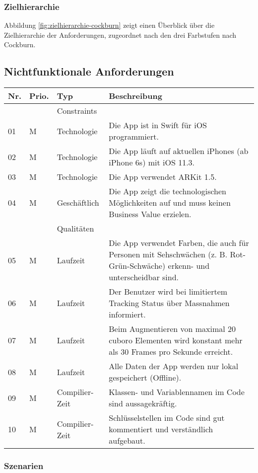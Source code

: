\subsubsection{Zielhierarchie}
Abbildung \ref{fig:zielhierarchie-cockburn} zeigt einen Überblick über die Zielhierarchie der Anforderungen, zugeordnet nach den drei Farbstufen nach Cockburn.

\subsection{Nichtfunktionale Anforderungen}

\begin{longtable}{l l l p{10cm}}
	\hline
	\textbf{Nr.} & \textbf{Prio.} & \textbf{Typ} & \textbf{Beschreibung} \\
	\hline
	 & & Constraints & \\
	\hline
	01 & M & Technologie & Die App ist in Swift für iOS programmiert. \\
	02 & M & Technologie & Die App läuft auf aktuellen iPhones (ab iPhone 6s) mit iOS 11.3. \\
	03 & M & Technologie & Die App verwendet ARKit 1.5. \\
	04 & M & Geschäftlich & Die App zeigt die technologischen Möglichkeiten auf und muss keinen Business Value erzielen. \\
	\hline
	 & & Qualitäten & \\
	\hline
	05 & M & Laufzeit & Die App verwendet Farben, die auch für Personen mit Sehschwächen (z. B. Rot-Grün-Schwäche) erkenn- und unterscheidbar sind. \\ 
	06 & M & Laufzeit & Der Benutzer wird bei limitiertem Tracking Status über Massnahmen informiert. \\
	07 & M & Laufzeit & Beim Augmentieren von maximal 20 cuboro Elementen wird konstant mehr als 30 Frames pro Sekunde erreicht. \\
	08 & M & Laufzeit & Alle Daten der App werden nur lokal gespeichert (Offline). \\
	09 & M & Compilier-Zeit & Klassen- und Variablennamen im Code sind aussagekräftig. \\
	10 & M & Compilier-Zeit & Schlüsselstellen im Code sind gut kommentiert und verständlich aufgebaut. \\
	\hline
\end{longtable}

\subsubsection{Szenarien}


